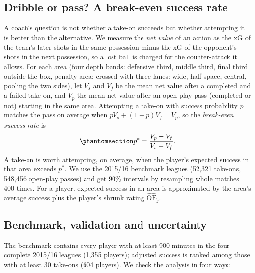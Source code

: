 \documentclass[
  12pt]{article}
\begin{document}
\subsection{Dribble or pass? A break-even success
rate}\label{sec-decision-method}

A coach's question is not whether a take-on succeeds but whether
attempting it is better than the alternative. We measure the \emph{net
value} of an action as the xG of the team's later shots in the same
possession minus the xG of the opponent's shots in the next possession,
so a lost ball is charged for the counter-attack it allows. For each
area (four depth bands: defensive third, middle third, final third
outside the box, penalty area; crossed with three lanes: wide,
half-space, central, pooling the two sides), let \(V_s\) and \(V_f\) be
the mean net value after a completed and a failed take-on, and \(V_p\)
the mean net value after an open-play pass (completed or not) starting
in the same area. Attempting a take-on with success probability \(p\)
matches the pass on average when \(pV_s+(1-p)V_f=V_p\), so the
\emph{break-even success rate} is
\begin{equation}\protect\phantomsection\label{eq-breakeven}{p^{*} = \frac{V_p - V_f}{V_s - V_f}.}\end{equation}
A take-on is worth attempting, on average, when the player's expected
success in that area exceeds \(p^{*}\). We use the 2015/16 benchmark
leagues (52,321 take-ons, 548,456 open-play passes) and get 90\%
intervals by resampling whole matches 400 times. For a player, expected
success in an area is approximated by the area's average success plus
the player's shrunk rating \(\widehat{\mathrm{OE}}_j\).

\subsection{Benchmark, validation and
uncertainty}\label{benchmark-validation-and-uncertainty}

The benchmark contains every player with at least 900 minutes in the
four complete 2015/16 leagues (1,355 players); adjusted success is
ranked among those with at least 30 take-ons (604 players). We check the
analysis in four ways:
\end{document}
